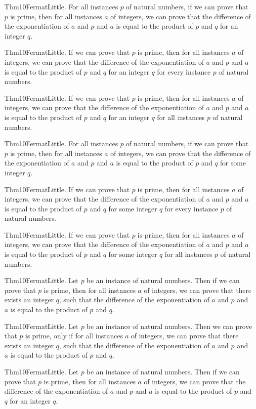 \documentclass{article}
\begin{document}
Thm10FermatLittle. For all instances $p$ of natural numbers, if we can prove that $p$ is prime, then for all instances $a$ of integers, we can prove that the difference of the exponentiation of $a$ and $p$ and $a$ is equal to the product of $p$ and $q$ for an integer $q$.

Thm10FermatLittle. If we can prove that $p$ is prime, then for all instances $a$ of integers, we can prove that the difference of the exponentiation of $a$ and $p$ and $a$ is equal to the product of $p$ and $q$ for an integer $q$ for every instance $p$ of natural numbers.

Thm10FermatLittle. If we can prove that $p$ is prime, then for all instances $a$ of integers, we can prove that the difference of the exponentiation of $a$ and $p$ and $a$ is equal to the product of $p$ and $q$ for an integer $q$ for all instances $p$ of natural numbers.

Thm10FermatLittle. For all instances $p$ of natural numbers, if we can prove that $p$ is prime, then for all instances $a$ of integers, we can prove that the difference of the exponentiation of $a$ and $p$ and $a$ is equal to the product of $p$ and $q$ for some integer $q$.

Thm10FermatLittle. If we can prove that $p$ is prime, then for all instances $a$ of integers, we can prove that the difference of the exponentiation of $a$ and $p$ and $a$ is equal to the product of $p$ and $q$ for some integer $q$ for every instance $p$ of natural numbers.

Thm10FermatLittle. If we can prove that $p$ is prime, then for all instances $a$ of integers, we can prove that the difference of the exponentiation of $a$ and $p$ and $a$ is equal to the product of $p$ and $q$ for some integer $q$ for all instances $p$ of natural numbers.

Thm10FermatLittle. Let $p$ be an instance of natural numbers. Then if we can prove that $p$ is prime, then for all instances $a$ of integers, we can prove that there exists an integer $q$, such that the difference of the exponentiation of $a$ and $p$ and $a$ is equal to the product of $p$ and $q$.

Thm10FermatLittle. Let $p$ be an instance of natural numbers. Then we can prove that $p$ is prime, only if for all instances $a$ of integers, we can prove that there exists an integer $q$, such that the difference of the exponentiation of $a$ and $p$ and $a$ is equal to the product of $p$ and $q$.

Thm10FermatLittle. Let $p$ be an instance of natural numbers. Then if we can prove that $p$ is prime, then for all instances $a$ of integers, we can prove that the difference of the exponentiation of $a$ and $p$ and $a$ is equal to the product of $p$ and $q$ for an integer $q$.
\end{document}

